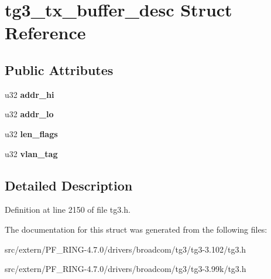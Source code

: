 \hypertarget{structtg3__tx__buffer__desc}{
\section{tg3\_\-tx\_\-buffer\_\-desc Struct Reference}
\label{structtg3__tx__buffer__desc}
}
\subsection*{Public Attributes}
\begin{DoxyCompactItemize}
\item 
\hypertarget{structtg3__tx__buffer__desc_afb505a9b37964171b9769da60ca4828b}{
u32 {\bfseries addr\_\-hi}}
\label{structtg3__tx__buffer__desc_afb505a9b37964171b9769da60ca4828b}

\item 
\hypertarget{structtg3__tx__buffer__desc_ac498332f5d4791b37593e0f34eb1e611}{
u32 {\bfseries addr\_\-lo}}
\label{structtg3__tx__buffer__desc_ac498332f5d4791b37593e0f34eb1e611}

\item 
\hypertarget{structtg3__tx__buffer__desc_a7cc8038a7158201a238e6d22e5914556}{
u32 {\bfseries len\_\-flags}}
\label{structtg3__tx__buffer__desc_a7cc8038a7158201a238e6d22e5914556}

\item 
\hypertarget{structtg3__tx__buffer__desc_aada2905b9771879e5010b56bbb6b8359}{
u32 {\bfseries vlan\_\-tag}}
\label{structtg3__tx__buffer__desc_aada2905b9771879e5010b56bbb6b8359}

\end{DoxyCompactItemize}


\subsection{Detailed Description}


Definition at line 2150 of file tg3.h.



The documentation for this struct was generated from the following files:\begin{DoxyCompactItemize}
\item 
src/extern/PF\_\-RING-\/4.7.0/drivers/broadcom/tg3/tg3-\/3.102/tg3.h\item 
src/extern/PF\_\-RING-\/4.7.0/drivers/broadcom/tg3/tg3-\/3.99k/tg3.h\end{DoxyCompactItemize}
